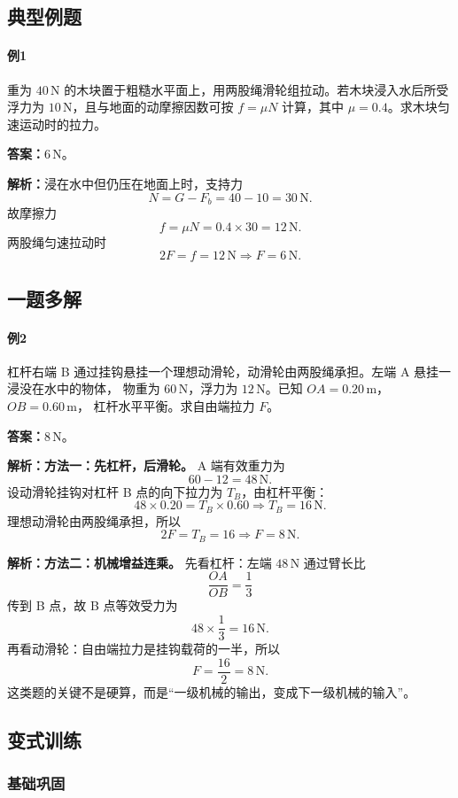 \documentclass[12pt,a4paper]{ctexart}
\newcommand{\Ans}[1]{\par\noindent\textbf{答案：}#1\par}
\newcommand{\Sol}[1]{\par\noindent\textbf{解析：}#1\par}
\begin{document}
\subsection{典型例题}
\paragraph{例1}
重为 $40\,\mathrm{N}$ 的木块置于粗糙水平面上，用两股绳滑轮组拉动。若木块浸入水后所受浮力为
$10\,\mathrm{N}$，且与地面的动摩擦因数可按 $f=\mu N$ 计算，其中 $\mu=0.4$。求木块匀速运动时的拉力。

\Ans{$6\,\mathrm{N}$。}
\Sol{浸在水中但仍压在地面上时，支持力
\[
N=G-F_b=40-10=30\,\mathrm{N}.
\]
故摩擦力
\[
f=\mu N=0.4\times 30=12\,\mathrm{N}.
\]
两股绳匀速拉动时
\[
2F=f=12\,\mathrm{N}\Rightarrow F=6\,\mathrm{N}.
\]}

\subsection{一题多解}
\paragraph{例2}
杠杆右端 B 通过挂钩悬挂一个理想动滑轮，动滑轮由两股绳承担。左端 A 悬挂一浸没在水中的物体，
物重为 $60\,\mathrm{N}$，浮力为 $12\,\mathrm{N}$。已知 $OA=0.20\,\mathrm{m}$，$OB=0.60\,\mathrm{m}$，
杠杆水平平衡。求自由端拉力 $F$。

\Ans{$8\,\mathrm{N}$。}

\Sol{\textbf{方法一：先杠杆，后滑轮。}
A 端有效重力为
\[
60-12=48\,\mathrm{N}.
\]
设动滑轮挂钩对杠杆 B 点的向下拉力为 $T_B$，由杠杆平衡：
\[
48\times 0.20 = T_B\times 0.60
\Rightarrow T_B=16\,\mathrm{N}.
\]
理想动滑轮由两股绳承担，所以
\[
2F=T_B=16 \Rightarrow F=8\,\mathrm{N}.
\]}

\Sol{\textbf{方法二：机械增益连乘。}
先看杠杆：左端 $48\,\mathrm{N}$ 通过臂长比
\[
\frac{OA}{OB}=\frac{1}{3}
\]
传到 B 点，故 B 点等效受力为
\[
48\times \frac{1}{3}=16\,\mathrm{N}.
\]
再看动滑轮：自由端拉力是挂钩载荷的一半，所以
\[
F=\frac{16}{2}=8\,\mathrm{N}.
\]
这类题的关键不是硬算，而是“一级机械的输出，变成下一级机械的输入”。}

\subsection{变式训练}

\subsubsection*{基础巩固}
\end{document}
